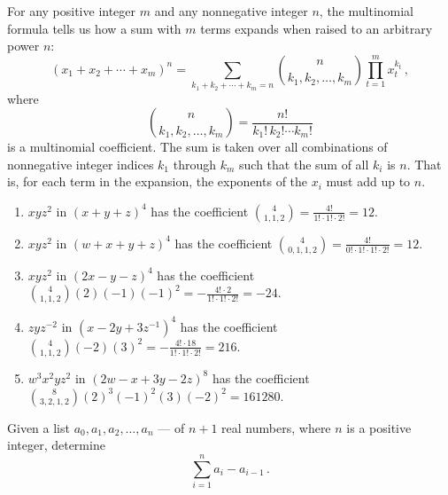 \documentclass[a4paper, english, 12pt]{article} %
\begin{document}
\begin{answer}
  For any positive integer $m$ and any nonnegative integer $n$, the multinomial
  formula tells us how a sum with $m$ terms expands when raised to an arbitrary
  power $n$:
  \begin{equation*}
    (x_1 + x_2  + \cdots + x_m)^n 
    = \sum_{k_1+k_2+\cdots+k_m=n} {n \choose k_1, k_2, \ldots, k_m}
    \prod_{t=1}^m x_t^{k_t}\,,
  \end{equation*}
  where
  \begin{equation*}
    \binom{n}{k_1, k_2, \ldots, k_m} = \frac{n!}{k_1!\, k_2! \cdots k_m!}
  \end{equation*}
  is a multinomial coefficient. The sum is taken over all combinations of
  nonnegative integer indices $k_1$ through $k_m$ such that the sum of all $k_i$ is $n$.
  That is, for each term in the expansion, the exponents of the $x_i$ must add up
  to $n$.

  \begin{enumerate}[label =\textbf{\alph*)}]
    \item $xyz^2$ in $(x+y+z)^4$ has the coefficient $\displaystyle
      \binom{4}{1,1,2} = \frac{4!}{1! \cdot 1! \cdot 2!} = 12$.
    \item $xyz^2$ in $(w + x + y+ z)^4$ has the coefficient $\displaystyle
      \binom{4}{0, 1, 1, 2} = \frac{4!}{0!\cdot 1! \cdot 1! \cdot 2!} = 12$.
    \item $xyz^2$ in $(2x - y - z)^4$ has the coefficient $\displaystyle
      \binom{4}{1,1,2} (2)(-1)(-1)^2= -\frac{4! \cdot 2}{1! \cdot 1! \cdot 2!} = -24$.
    \item $zyz^{-2}$ in $(x - 2y + 3z^{-1})^4$ has the coefficient $\displaystyle
      \binom{4}{1,1,2}(-2)(3)^2 = -\frac{4! \cdot 18}{1! \cdot 1! \cdot 2!} = 216$.
    \item $w^3x^2yz^2$ in $(2w - x + 3y - 2z)^{8}$ has the coefficient $\displaystyle
      \binom{8}{3,2,1,2} (2)^3 (-1)^2 (3)(-2)^2= \num{161280}$.
  \end{enumerate}
\end{answer}

\newpageanswer

\begin{problem}[33]
  \begin{subproblem}[2]
    \label{subproblem:33b}
    Given a list $a_0, a_1, a_2, \ldots, a_n$ --- of $n+1$ real numbers, where
    $n$ is a positive integer, determine
    \begin{equation*}
      \sum_{i = 1}^{n} a_i - a_{i - 1}\,.
    \end{equation*}
  \end{subproblem}
\end{problem}
\end{document}
